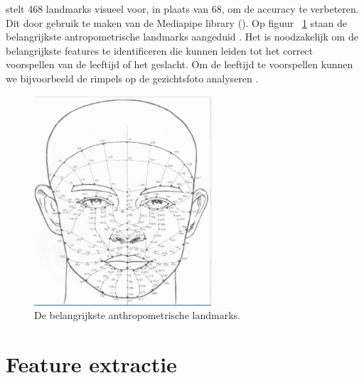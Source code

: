 \textcite{Sanil2023} stelt 468 landmarks visueel voor, in plaats van 68, om de accuracy te verbeteren. Dit door gebruik te maken van de Mediapipe library (\textcite{Zubair2021}). Op figuur {~\ref{fig:landmarks}} staan de belangrijkste antropometrische landmarks aangeduid . Het is noodzakelijk om de belangrijkste features te identificeren die kunnen leiden tot het correct voorspellen van de leeftijd of het geslacht. Om de leeftijd te voorspellen kunnen we bijvoorbeeld de rimpels op de gezichtsfoto analyseren \autocite{Kwon1994}. 
\begin{figure}
    \centering
    \includegraphics{graphics/faciallandmarks.png}
    \caption[Belangrijkste anthropometrische landmarks]{De belangrijkste anthropometrische landmarks\autocite{Sanil2023}.
    \label{fig:landmarks}}
\end{figure}


\section{Feature extractie} \label{sec:featextractie}
